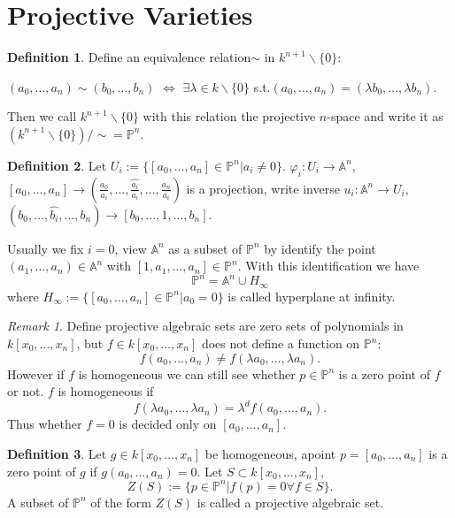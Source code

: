 \documentclass{amsart}
\theoremstyle{plain}
\theoremstyle{definition}
\newtheorem{definition}{Definition}
\theoremstyle{remark}
\newtheorem*{remark}{Remark}
\numberwithin{equation}{section}
\begin{document}
\section{Projective Varieties}
\begin{definition}
	Define an equivalence relation$ \sim $ in $ k^{n+1}\backslash \{0\} $:
	\begin{center}
		$ (a_0,\dots,a_n)\sim(b_0,\dots,b_n) $ $ \Leftrightarrow $ $ \exists \lambda\in k\backslash \{0\} $ s.t.$ (a_0,\dots,a_n) = (\lambda b_0,\dots,\lambda b_n)$.
	\end{center} 
Then we call $  k^{n+1}\backslash \{0\} $ with this relation the projective $ n $-space and write it as $ (k^{n+1}\backslash\{0\})/\sim = \mathbb{P}^n $. 
\end{definition}
\begin{definition}
	Let $ U_i:=\{[a_0,\dots,a_n]\in \mathbb{P}^n|a_i\neq 0 \} $. $ \varphi_i: U_i\to \mathbb{A}^n $, $ [a_0,\dots,a_n]\to (\frac{a_0}{a_i},\dots,\hat{\frac{a_i}{a_i}},\dots,\frac{a_n}{a_i}) $ is a projection, write inverse $ u_i:\mathbb{A}^n\to U_i $, $ (b_0,\dots,\hat{b_i},\dots,b_n)\to [b_0,\dots,1,\dots,b_n] $.
	
	Usually we fix $ i=0 $, view $ \mathbb{A}^n $ as a subset of $ \mathbb{P}^n $ by identify the point $ (a_1,\dots,a_n)\in\mathbb{A}^n $ with $ [1,a_1,\dots,a_n]\in \mathbb{P}^n $. With this identification we have 
	\begin{equation}
	\mathbb{P}^n=\mathbb{A}^n\cup H_{\infty}
	\end{equation} 
where $ H_{\infty} :=\{ [a_0,\dots,a_n]\in \mathbb{P}^n|a_0=0 \} $ is called hyperplane at infinity.
\end{definition}
\begin{remark}
	Define projective algebraic sets are zero sets of polynomials in $ k[x_0,\dots,x_n] $, but $ f\in k[x_0,\dots,x_n] $ does not define a function on $ \mathbb{P}^n $:
	\begin{equation}
	f(a_0,\dots,a_n)\neq f(\lambda a_0,\dots,\lambda a_n).
	\end{equation}
	However if $ f $ is homogeneous we can still see whether $ p\in \mathbb{P}^n $ is a zero point of $ f $ or not. $ f $ is homogeneous if 
	\begin{equation}
	f(\lambda a_0,\dots,\lambda a_n)=\lambda^d f(a_0,\dots,a_n).
	\end{equation}
	Thus whether $ f=0 $ is decided only on $ [a_0,\dots,a_n] $.
\end{remark}
\begin{definition}
	Let $ g\in k[x_0,\dots,x_n] $ be homogeneous, apoint $ p=[a_0,\dots,a_n] $ is a zero point of $ g $ if $ g(a_0,\dots,a_n)=0 $. Let $ S\subset k[x_0,\dots,x_n] $,
	\begin{equation}
	Z(S):=\{ p\in\mathbb{P}^n|f(p)=0 \forall f\in S \}.
	\end{equation}
	A subset of $ \mathbb{P}^n $ of the form $ Z(S) $ is called a projective algebraic set.
\end{definition}
\end{document}
